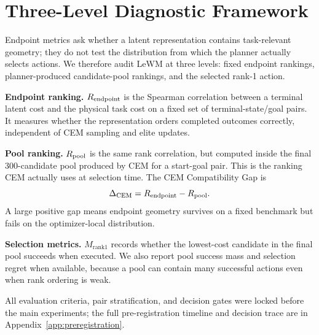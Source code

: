 \section{Three-Level Diagnostic Framework}

Endpoint metrics ask whether a latent representation contains task-relevant geometry; they do not test the distribution from which the planner actually selects actions. We therefore audit LeWM at three levels: fixed endpoint rankings, planner-produced candidate-pool rankings, and the selected rank-1 action.

\textbf{Endpoint ranking.} $R_\text{endpoint}$ is the Spearman correlation between a terminal latent cost and the physical task cost on a fixed set of terminal-state/goal pairs. It measures whether the representation orders completed outcomes correctly, independent of CEM sampling and elite updates.

\textbf{Pool ranking.} $R_\text{pool}$ is the same rank correlation, but computed inside the final 300-candidate pool produced by CEM for a start-goal pair. This is the ranking CEM actually uses at selection time. The CEM Compatibility Gap is
\[
\Delta_\text{CEM} = R_\text{endpoint} - R_\text{pool}.
\]
A large positive gap means endpoint geometry survives on a fixed benchmark but fails on the optimizer-local distribution.

\textbf{Selection metrics.} $M_\mathrm{rank1}$ records whether the lowest-cost candidate in the final pool succeeds when executed. We also report pool success mass and selection regret when available, because a pool can contain many successful actions even when rank ordering is weak.

All evaluation criteria, pair stratification, and decision gates were locked before the main experiments; the full pre-registration timeline and decision trace are in Appendix~\ref{app:preregistration}.
